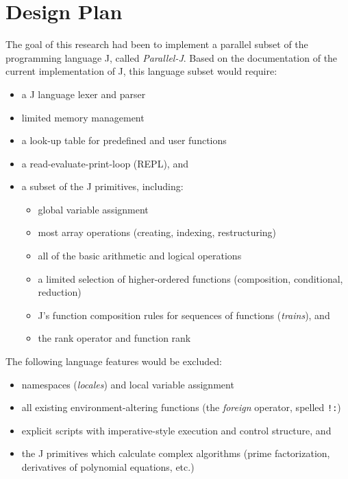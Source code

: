 \section{Design Plan}
\label{desp}
The goal of this research had been 
to implement a parallel subset of the programming language J, called \textit{Parallel-J}.
Based on the documentation of the current implementation of J\cite{ioj}, this language subset would require:
\begin{itemize}
	\item a J language lexer and parser
	\item limited memory management
	\item a look-up table for predefined and user functions
	\item a read-evaluate-print-loop (REPL), and
	\item a subset of the J primitives, including: 
	\begin{itemize}
		\item global variable assignment
		\item most array operations (creating, indexing, restructuring)
		\item all of the basic arithmetic and logical operations
		\item a limited selection of higher-ordered functions (composition, conditional, reduction)
		\item J's function composition rules for sequences of functions (\textit{trains}), and
		\item the rank operator and function rank
	\end{itemize}
\end{itemize}
\noindent
The following language features would be excluded:
\begin{itemize}
	\item namespaces (\textit{locales}) and local variable assignment
	\item all existing environment-altering functions (the \textit{foreign} operator, spelled \texttt{!:})
	\item explicit scripts with imperative-style execution and control structure, and
	\item the J primitives which calculate complex algorithms (prime factorization, derivatives of polynomial equations, etc.)
\end{itemize}


